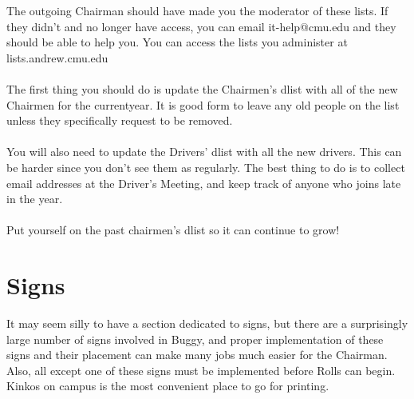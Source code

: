 The outgoing Chairman should have made you the moderator of these lists.
If they didn't and no longer have access, you can email it-help@cmu.edu
and they should be able to help you. You can access the lists you administer
at lists.andrew.cmu.edu
\\\\
The first thing you should do is update the Chairmen's dlist with all of
the new Chairmen for the currentyear. It is good form to leave any old people
on the list unless they specifically request to be removed.
\\\\
You will also need to update the Drivers' dlist with all the new drivers.
This can be harder since you don't see them as regularly. The best thing to
do is to collect email addresses at the Driver's Meeting, and keep track
of anyone who joins late in the year.
\\\\
Put yourself on the past chairmen's dlist so it can continue to grow!

\section{Signs}
\label{sec:Signs}
It may seem silly to have a section dedicated to signs, but there are a
surprisingly large number of signs involved in Buggy, and proper implementation
of these signs and their placement can make many jobs much easier for the
Chairman. Also, all except one of these signs must be implemented before
Rolls can begin. Kinkos on campus is the most convenient place to go for
printing.


